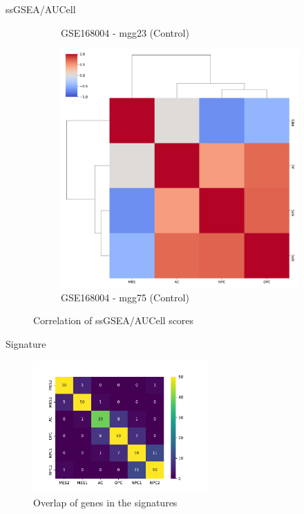 \documentclass[aspectratio=169,9pt]{beamer}
\begin{document}
\begin{frame}{ssGSEA/AUCell}
\begin{adjustwidth}{-5cm}{-5cm}
\begin{figure}
\begin{subfigure}[b]{0.38\textwidth}
                    \caption{GSE168004 - mgg23 (Control)}
                \end{subfigure}
                \begin{subfigure}[b]{0.38\textwidth}
                    \centering
                    \includegraphics[width=\textwidth]{AUCell_mgg75_corrplot_4D}
                    \caption{GSE168004 - mgg75 (Control)}
                \end{subfigure}
                \caption{Correlation of ssGSEA/AUCell scores}
            \end{figure}
        \end{adjustwidth}
    \end{frame}

    \begin{frame}{Signature}
        \begin{figure}
            \centering
            \includegraphics[width=0.6\textwidth]{signature_overlap}
            \caption{Overlap of genes in the signatures}
        \end{figure}
    \end{frame}
\end{document}
